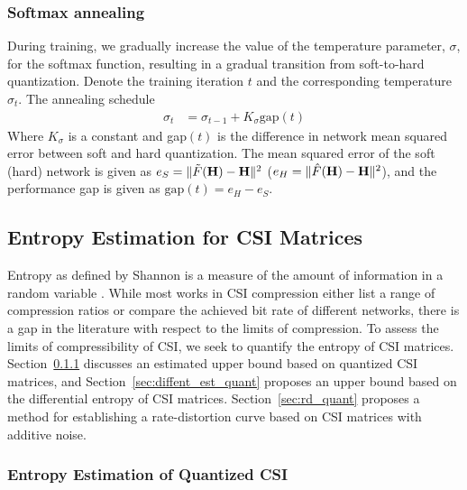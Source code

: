 \subsubsection{Softmax annealing}

During training, we gradually increase the value of the temperature parameter, $\sigma$, for the softmax function, resulting in a gradual transition from soft-to-hard quantization. Denote the training iteration $t$ and the corresponding temperature $\sigma_t$. The annealing schedule 
\begin{align*}
	\sigma_t &= \sigma_{t-1} + K_{\sigma}\text{gap}(t)
\end{align*}
Where $K_\sigma$ is a constant and gap$(t)$ is the difference in network mean squared error between soft and hard quantization. The mean squared error of the soft (hard) network is given as $e_S=\Arrowvert \tilde F(\mathbf H) - \mathbf H\Arrowvert^2$ ($e_H=\Arrowvert \hat F(\mathbf H) - \mathbf H\Arrowvert^2$), and the performance gap is given as $\text{gap}(t)=e_H - e_S$.

\subsection{Entropy Estimation for CSI Matrices}

Entropy as defined by Shannon is a measure of the amount of information in a random variable \cite{ref:Shannon1948Mathematical}. While most works in CSI compression either list a range of compression ratios or compare the achieved bit rate of different networks, there is a gap in the literature with respect to the limits of compression. To assess the limits of compressibility of CSI, we seek to quantify the entropy of CSI matrices.
Section~\ref{sec:ent_est_quant} discusses an estimated upper bound based on quantized CSI matrices, and Section~\ref{sec:diffent_est_quant} proposes an upper bound based on the differential entropy of CSI matrices. Section~\ref{sec:rd_quant} proposes a method for establishing a rate-distortion curve based on CSI matrices with additive noise.

\subsubsection{Entropy Estimation of Quantized CSI} \label{sec:ent_est_quant}

